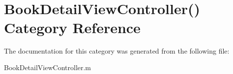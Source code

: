 \section{Book\+Detail\+View\+Controller() Category Reference}
\label{category_book_detail_view_controller_07_08}


The documentation for this category was generated from the following file\+:\begin{DoxyCompactItemize}
\item 
Book\+Detail\+View\+Controller.\+m\end{DoxyCompactItemize}
